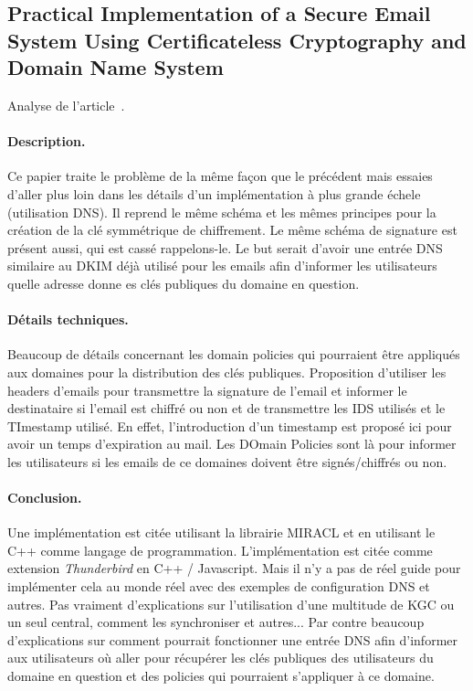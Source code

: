 \subsection{Practical Implementation of a Secure Email System Using Certificateless Cryptography and Domain Name System}
Analyse de l'article~\cite{DBLP:journals/ijnsec/BalakrishnanR16}.
\paragraph*{Description.} Ce papier traite le problème de la même façon que le précédent mais essaies d'aller plus loin dans les détails d'un implémentation à plus grande échele (utilisation DNS). Il reprend le même schéma et les mêmes principes pour la création de la clé symmétrique de chiffrement. Le même schéma de signature est présent aussi, qui est cassé rappelons-le. Le but serait d'avoir une entrée DNS similaire au DKIM déjà utilisé pour les emails afin d'informer les utilisateurs quelle adresse donne es clés publiques du domaine en question.
\paragraph*{Détails techniques.} Beaucoup de détails concernant les domain policies qui pourraient être appliqués aux domaines pour la distribution des clés publiques. Proposition d'utiliser les headers d'emails pour transmettre la signature de l'email et informer le destinataire si l'email est chiffré ou non et de transmettre les IDS utilisés et le TImestamp utilisé. En effet, l'introduction d'un timestamp est proposé ici pour avoir un temps d'expiration au mail. Les DOmain Policies sont là pour informer les utilisateurs si les emails de ce domaines doivent être signés/chiffrés ou non.
\paragraph*{Conclusion.} Une implémentation est citée utilisant la librairie MIRACL et en utilisant le C++ comme langage de programmation. L'implémentation est citée comme extension \textit{Thunderbird} en C++ / Javascript. Mais il n'y a pas de réel guide pour implémenter cela au monde réel avec des exemples de configuration DNS et autres. Pas vraiment d'explications sur l'utilisation d'une multitude de KGC ou un seul central, comment les synchroniser et autres... Par contre beaucoup d'explications sur comment pourrait fonctionner une entrée DNS afin d'informer aux utilisateurs où aller pour récupérer les clés publiques des utilisateurs du domaine en question et des policies qui pourraient s'appliquer à ce domaine.
